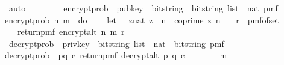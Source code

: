 \begin{isabellebody}
\ auto\isanewline
\ \ \ \ \isamarkupfalse%
\ \ \isanewline
{}\isamarkupfalse%
%
\endisatagproof
{\isafoldproof}%
%
\isadelimproof
\isanewline
%
\endisadelimproof
\isanewline
\isanewline
\isanewline
\isanewline
{}\isamarkupfalse%
\ encrypt{\isacharunderscore}{\kern0pt}prob\ {\isacharcolon}{\kern0pt}{\isacharcolon}{\kern0pt}\ {\isachardoublequoteopen}pub{\isacharunderscore}{\kern0pt}key\ {\isasymRightarrow}\ bitstring\ {\isasymRightarrow}\ {\isacharparenleft}{\kern0pt}bitstring\ list\ {\isasymtimes}\ nat{\isacharparenright}{\kern0pt}\ pmf{\isachardoublequoteclose}\ \isanewline
{\isachardoublequoteopen}encrypt{\isacharunderscore}{\kern0pt}prob\ n\ m\ {\isacharequal}{\kern0pt}\ do\ {\isacharbraceleft}{\kern0pt}\isanewline
\ \ \ let\ {\isasymZ}\ {\isacharequal}{\kern0pt}\ {\isacharbraceleft}{\kern0pt}{\isacharparenleft}{\kern0pt}z{\isacharcolon}{\kern0pt}{\isacharcolon}{\kern0pt}nat{\isacharparenright}{\kern0pt}{\isachardot}{\kern0pt}\ z\ {\isacharless}{\kern0pt}\ n\ {\isasymand}\ coprime\ z\ n{\isacharbraceright}{\kern0pt}{\isacharsemicolon}{\kern0pt}\isanewline
\ \ \ r\ {\isasymleftarrow}\ pmf{\isacharunderscore}{\kern0pt}of{\isacharunderscore}{\kern0pt}set\ {\isasymZ}{\isacharsemicolon}{\kern0pt}\isanewline
\ \ \ return{\isacharunderscore}{\kern0pt}pmf\ {\isacharparenleft}{\kern0pt}encrypt{\isacharunderscore}{\kern0pt}alt\ n\ m\ r{\isacharparenright}{\kern0pt}\isanewline
{\isacharbraceright}{\kern0pt}{\isachardoublequoteclose}\isanewline
\isanewline
\isanewline
{}\isamarkupfalse%
\ decrypt{\isacharunderscore}{\kern0pt}prob\ {\isacharcolon}{\kern0pt}{\isacharcolon}{\kern0pt}\ {\isachardoublequoteopen}priv{\isacharunderscore}{\kern0pt}key\ {\isasymRightarrow}\ {\isacharparenleft}{\kern0pt}bitstring\ list\ {\isasymtimes}\ nat{\isacharparenright}{\kern0pt}\ {\isasymRightarrow}\ bitstring\ pmf{\isachardoublequoteclose}\ \isanewline
{\isachardoublequoteopen}decrypt{\isacharunderscore}{\kern0pt}prob\ {\isacharequal}{\kern0pt}\ {\isacharparenleft}{\kern0pt}{\isasymlambda}{\isacharparenleft}{\kern0pt}p{\isacharcomma}{\kern0pt}q{\isacharparenright}{\kern0pt}\ c{\isachardot}{\kern0pt}\ return{\isacharunderscore}{\kern0pt}pmf\ {\isacharparenleft}{\kern0pt}decrypt{\isacharunderscore}{\kern0pt}alt\ p\ q\ c{\isacharparenright}{\kern0pt}{\isacharparenright}{\kern0pt}{\isachardoublequoteclose}\isanewline
\isanewline
\isanewline
{}\isamarkupfalse%
\isanewline
\ \ \ \isanewline
\ \ \ \ {\isachardoublequoteopen}m\ {\isasymnoteq}\ {\isacharbrackleft}{\kern0pt}{\isacharbrackright}{\kern0pt}{\isachardoublequoteclose}\isanewline

\end{isabellebody}
